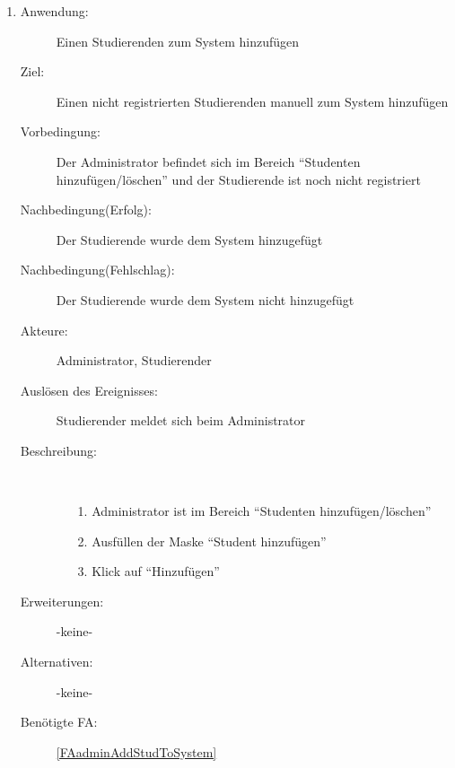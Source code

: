 \documentclass[parskip=full]{scrartcl}
\newcommand{\swtLabel}[1]{\textbf{/#1\arabic*0/}}
\begin{document}
\begin{enumerate} [label=\swtLabel{A}]
  \item \label{UCadminCreateStudierender}
    \begin{description}
  	\item[Anwendung:] Einen Studierenden zum System hinzufügen
  	\item[Ziel:] Einen nicht registrierten Studierenden manuell zum System
  	hinzufügen
  	\item[Vorbedingung:] Der Administrator befindet sich im Bereich
  	\enquote{Studenten hinzufügen/löschen} und der Studierende ist noch nicht
  	registriert
  	\item[Nachbedingung(Erfolg):] Der Studierende wurde dem System hinzugefügt
  	\item[Nachbedingung(Fehlschlag):] Der Studierende wurde dem System nicht
  	hinzugefügt
  	\item[Akteure:] Administrator, Studierender
  	\item[Auslösen des Ereignisses:] Studierender meldet sich beim Administrator
  	\item[Beschreibung:]~
  	\begin{enumerate}
  	  \item[1.] Administrator ist im Bereich \enquote{Studenten
  	  hinzufügen/löschen}
      \item[2.] Ausfüllen der Maske \enquote{Student hinzufügen}
      \item[3.] Klick auf \enquote{Hinzufügen}
  	\end{enumerate}
  	\item[Erweiterungen:] -keine-
  	\item[Alternativen:] -keine-
  	\item[Benötigte FA:] \ref{FAadminAddStudToSystem}
  \end{description}
  

\end{enumerate}
\end{document}

